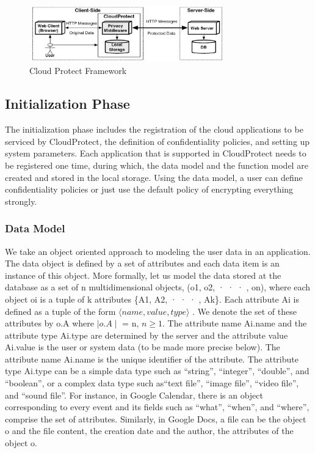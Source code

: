 \documentclass[11pt,onecolumn]{article}
\begin{document}
\begin{figure}
  \centering
  \includegraphics[width=0.75\textwidth]{cloudprotect.jpg}
  \caption{Cloud Protect Framework}
  \label{Fig1}
\end{figure}



\subsection{Initialization Phase}
The initialization phase includes the registration of the cloud applications to be serviced
by CloudProtect, the definition of confidentiality policies, and setting up system
parameters. Each application that is supported in CloudProtect needs to be registered
one time, during which, the data model and the function model are created and stored
in the local storage. Using the data model, a user can define confidentiality policies
or just use the default policy of encrypting everything strongly.
\subsubsection{Data Model}
We take an object oriented approach to modeling the user data in an application.
The data object is defined by a set of attributes and each data item is an instance
of this object. More formally, let us model the data stored at the database as a
set of n multidimensional objects, (o1, o2, · · · , on), where each object oi is a tuple of
k attributes \{A1, A2, · · · , Ak\}. Each attribute Ai is defined as a tuple of the form 	 $\langle name, value, type \rangle$	. We denote the set of these attributes by o.A where $\mid o.A\mid$ = n,
$n \ge 1$. The attribute name Ai.name and the attribute type Ai.type are determined by
the server and the attribute value Ai.value is the user or system data (to be made more
precise below). The attribute name Ai.name is the unique identifier of the attribute.
The attribute type Ai.type can be a simple data type such as “string”, “integer”,
“double”, and “boolean”, or a complex data type such as“text file”, “image file”,
“video file”, and “sound file”. For instance, in Google Calendar, there is an object
corresponding to every event and its fields such as “what”, “when”, and “where”,
comprise the set of attributes. Similarly, in Google Docs, a file can be the object o
and the file content, the creation date and the author, the attributes of the object o.
\end{document}
